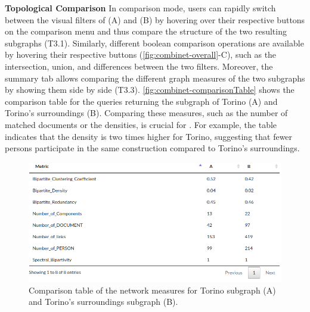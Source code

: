 \noindent\textbf{Topological Comparison}
In comparison mode,
users can rapidly switch between the visual filters of (A) and (B) by hovering over their respective buttons on the comparison menu and thus compare the structure of the two resulting subgraphs (T3.1).
Similarly, different boolean comparison operations are available by hovering their respective buttons (\autoref{fig:combinet-overall}-C), such as the intersection, union, and differences between the two filters. %
Moreover, the summary tab allows comparing the different graph measures of the two subgraphs by showing them side by side (T3.3).
\autoref{fig:combinet-comparisonTable} shows the comparison table for the queries returning the subgraph of Torino (A) and Torino's surroundings (B).
Comparing these measures, such as the number of matched documents or the densities, is crucial for \sna.
For example, the table indicates that the density is two times higher for Torino, suggesting that fewer persons participate in the same construction compared to Torino's surroundings.

\begin{figure}[!ht]
    \centering
    \includegraphics[width=0.8\linewidth]{static/figures/ComBiNet/graph_measures_Torino_territoireandpiemont}
  \caption{Comparison table of the network measures for Torino subgraph (A) and Torino's surroundings subgraph (B).}\label{fig:combinet-comparisonTable}
\end{figure}


